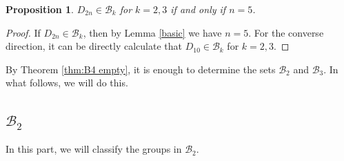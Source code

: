 \documentclass[12pt,a4paper]{article}
\newtheorem{pro}[thm]{Proposition}
\begin{document}
	\begin{pro}\label{pro:D10}
		$D_{2n}\in \mathcal{B}_k$ for $k=2,3$ if and only if $n=5$.
	\end{pro}
	\begin{proof}
		If $D_{2n}\in \mathcal{B}_k$, then by Lemma \ref{basic} we have $n=5$.
		For the converse direction, it can be directly calculate that $D_{10}\in \mathcal{B}_k$ for $k=2,3$.
	\end{proof}
	 By Theorem \ref{thm:B4 empty}, it is enough to determine the sets $\mathcal{B}_2$ and $\mathcal{B}_3$. In what follows, we will do this.
	\subsection{$\mathcal{B}_2$}
	In this part, we will classify the groups in $\mathcal{B}_2$.
	
\end{document}
